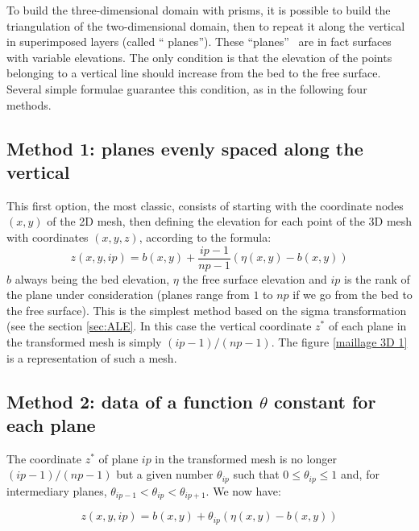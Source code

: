 To build the three-dimensional domain with prisms, it is possible to build the
triangulation of the two-dimensional domain, then to repeat it along the
vertical in superimposed layers (called \textquotedblleft
planes\textquotedblright). These \textquotedblleft planes\textquotedblright%
\ are in fact surfaces with variable elevations. The only condition is that
the elevation of the points belonging to a vertical line should increase from the
bed to the free surface. Several simple formulae guarantee this condition,
as in the following four methods.

\subsection{\label{maillage 3D methode 1}Method 1: planes evenly spaced
along the vertical}

This first option, the most classic, consists of starting with the coordinate
nodes $(x,y)$ of the 2D mesh, then defining the elevation for each point of
the 3D mesh with coordinates $(x,y,z)$, according to the formula:%
\begin{equation}
z(x,y,ip)=b\left(  x,y\right)  +\dfrac{ip-1}{np-1}\left(  \eta\left(
x,y\right)  -b\left(  x,y\right)  \right)
\end{equation}
$b$ always being the bed elevation, $\eta$ the free surface elevation
and $ip$ is the rank of the plane under consideration (planes range from $1$
to $np$ if we go from the bed to the free surface). This is the simplest
method based on the sigma transformation (see the section \ref{sec:ALE}.
In this case the vertical coordinate $z^{\ast}$ of each plane in the
transformed mesh is simply $(ip-1)/(np-1)$. The figure \ref{maillage 3D 1}
is a representation of such a mesh.

\subsection{\label{maillage 3D methode 2}Method 2: data of a function
$\theta$ constant for each plane}

The coordinate $z^{\ast}$ of plane $ip$ in the transformed mesh is no longer
$(ip-1)/(np-1)$ but a given number $\theta_{ip}$ such that $0\leq
\theta_{ip}\leq1$ and, for intermediary planes, $\theta_{ip-1}<\theta
_{ip}<\theta_{ip+1}$. We now have:

\begin{equation}
z(x,y,ip)=b\left(  x,y\right)  +\theta_{ip}\left(  \eta\left(
x,y\right)  -b\left(  x,y\right)  \right)
\end{equation}

